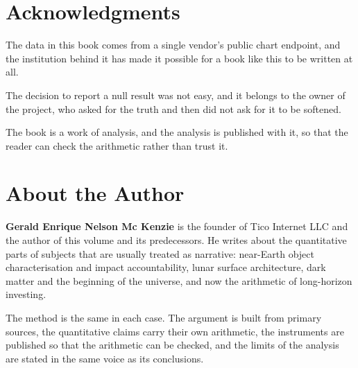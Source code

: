 \begingroup
\scriptsize

\endgroup
\clearpage

\printindex

\chapter*{Acknowledgments}
\thispagestyle{plain}

The data in this book comes from a single vendor's public chart endpoint,
and the institution behind it has made it possible for a book like this to
be written at all.

The decision to report a null result was not easy, and it belongs to the
owner of the project, who asked for the truth and then did not ask for it
to be softened.

\begin{keytakeaways}
\item The book is a work of analysis, and the analysis is published with
it, so that the reader can check the arithmetic rather than trust it.
\end{keytakeaways}
\clearpage

\chapter*{About the Author}
\thispagestyle{plain}

\noindent\textbf{Gerald Enrique Nelson Mc Kenzie} is the founder of Tico
Internet LLC and the author of this volume and its predecessors. He
writes about the quantitative parts of subjects that are usually treated as
narrative: near-Earth object characterisation and impact accountability,
lunar surface architecture, dark matter and the beginning of the universe,
and now the arithmetic of long-horizon investing.

The method is the same in each case. The argument is built from primary
sources, the quantitative claims carry their own arithmetic, the
instruments are published so that the arithmetic can be checked, and the
limits of the analysis are stated in the same voice as its conclusions.

